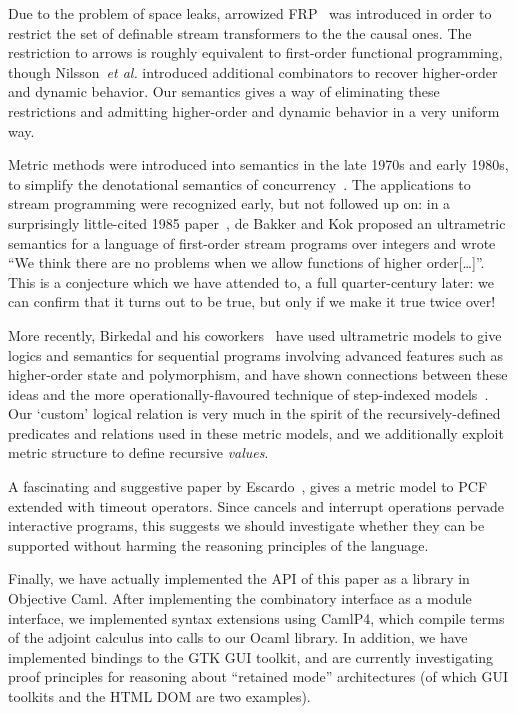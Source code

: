 \documentclass[nocopyrightspace,preprint]{sigplanconf}
\begin{document}
Due to the problem of space leaks, arrowized FRP~\cite{arrowized-frp}
was introduced in order to restrict the set of definable stream
transformers to the the causal ones. The restriction to arrows is
roughly equivalent to first-order functional programming, though
Nilsson~\emph{et al.}  introduced additional combinators to recover
higher-order and dynamic behavior. Our semantics gives a way of
eliminating these restrictions and admitting higher-order and dynamic
behavior in a very uniform way.


Metric methods were introduced into semantics in the late
1970s and early 1980s, to simplify the
denotational semantics of
concurrency~\cite{concurrency-semantics}. The applications to stream
programming were recognized early, but not followed up on: in a
surprisingly little-cited 1985 paper~\cite{metric-dataflow}, de Bakker
and Kok proposed an ultrametric semantics for a language of
first-order stream programs over integers and wrote
``We think there are no problems when we allow functions of higher
order[\ldots]''.  This is a conjecture which we have attended to, a
full quarter-century later: we can confirm that it turns out to be
true, but only if we make it true twice over!

More recently, Birkedal and his coworkers~\cite{birkedal-ultrametrics}
have used ultrametric models to give logics and semantics for
sequential programs involving advanced features such as higher-order
state and polymorphism, and have shown connections between these
ideas and the more operationally-flavoured technique of step-indexed
models~\cite{appel-mcallester}. Our `custom' logical relation is very much in the spirit of the recursively-defined predicates and relations used in these metric models, and we additionally exploit metric structure to define recursive \emph{values}.

A fascinating and suggestive paper by Escardo~\cite{escardo-metric},
gives a metric model to PCF extended with timeout operators. Since
cancels and interrupt operations pervade interactive programs, this
suggests we should investigate whether they can be supported without
harming the reasoning principles of the language.

Finally, we have actually implemented the API of this paper as a
library in Objective Caml. After implementing the combinatory
interface as a module interface, we implemented syntax extensions
using CamlP4, which compile terms of the adjoint calculus into calls
to our Ocaml library. In addition, we have implemented bindings to the
GTK GUI toolkit, and are currently investigating proof principles
for reasoning about ``retained mode'' architectures (of
which GUI toolkits and the HTML DOM are two examples). 








\end{document}
